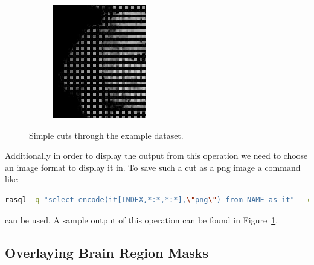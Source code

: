 \begin{figure}[h]
\begin{subfigure}{.3\textwidth}
\end{subfigure}
\space\space\space
\begin{subfigure}{.3\textwidth}
  \centering
  \includegraphics[width=\textwidth]{imgs/CutC}
\end{subfigure}
\caption{Simple cuts through the example dataset. }
\label{fig:cuts}
\end{figure}

Additionally in order to display the output from this operation we need to choose an image format to display it in. To save such a cut as a png image a command like
\begin{lstlisting}[showstringspaces=false,morekeywords={NAME,INDEX,FILENAME},language=Bash]
rasql -q "select encode(it[INDEX,*:*,*:*],\"png\") from NAME as it" --out file --outfile FILENAME
\end{lstlisting}
can be used. A sample output of this operation can be found in Figure~\ref{fig:cuts}.

\subsection{Overlaying Brain Region Masks}

